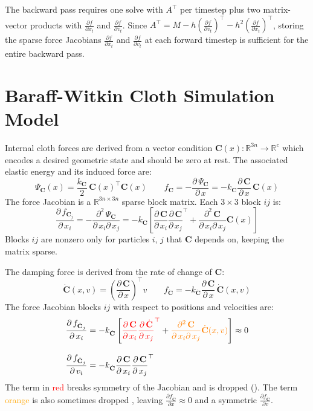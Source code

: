 \documentclass{article}
\newcommand{\pd}[2]{\dfrac{\partial\, #1}{\partial\, #2}}
\newcommand{\pdc}[2]{\frac{\partial #1}{\partial #2}}
\newcommand{\pdm}[3]{\dfrac{\partial^2\, #1}{\partial\, #2 \partial\, #3}}
\newcommand{\drop}[1]{\textcolor{red}{#1}}
\newcommand{\maybedrop}[1]{\textcolor{orange}{#1}}
\begin{document}
The backward pass requires one solve with $A^\top$ per timestep plus two matrix-vector products with $\pdc{f}{x_t}$ and $\pdc{f}{v_t}$. Since $A^\top = M - h\left(\pdc{f}{v_t}\right)^\top - h^2\left(\pdc{f}{x_t}\right)^\top$, storing the sparse force Jacobians $\pdc{f}{x_t}$ and $\pdc{f}{v_t}$ at each forward timestep is sufficient for the entire backward pass.

\newpage

\section{Baraff-Witkin Cloth Simulation Model \cite{baraff1998large}}
\label{sec:baraff_witkin}

Internal cloth forces are derived from a vector condition $\mathbf{C}(x) : \mathbb{R}^{3n}\rightarrow\mathbb{R}^c$ which encodes a desired geometric state and should be zero at rest. The associated elastic energy and its induced force are:
\begin{equation}
\label{eq:energy_force}
    \Psi_\mathbf{C}(x) = \frac{k_\mathbf{C}}{2}\, \mathbf{C}(x)^\top\mathbf{C}(x)
    \qquad
    f_\mathbf{C} = -\pd{\Psi_\mathbf{C}}{x} = 
    -k_\mathbf{C} \pd{\mathbf{C}}{x}\, \mathbf{C}(x)
\end{equation}
The force Jacobian is a $\mathbb{R}^{3n \times 3n}$ sparse block matrix. Each $3\times 3$ block $ij$ is:
\begin{equation}
\label{eq:force_jacobian}
\pd{f_{\mathbf{C}_j}}{x_i} = -\pdm{\Psi_\mathbf{C}}{x_i}{x_j} = 
    -k_\mathbf{C}\left[ 
        \pd{\mathbf{C}}{x_i} \pd{\mathbf{C}}{x_j}^\top + 
        \pdm{\mathbf{C}}{x_i}{x_j}\mathbf{C}(x)
    \right]
\end{equation}
Blocks $ij$ are nonzero only for particles $i$, $j$ that $\mathbf{C}$ depends on, keeping the matrix sparse.

The damping force is derived from the rate of change of $\mathbf{C}$:
\begin{equation}
\label{eq:damping_force}
    \dot{\mathbf{C}}(x, v) = \left(\pd{\mathbf{C}}{x}\right)^\top v
    \qquad
    f_{\dot{\mathbf{C}}} = -k_{\dot{\mathbf{C}}} \pd{\mathbf{C}}{x}\, \dot{\mathbf{C}}(x, v)
\end{equation}
The force Jacobian blocks $ij$ with respect to positions and velocities are:
\begin{align}
\label{eq:damping_jacobian_force}
    \pd{f_{\dot{\mathbf{C}}_j}}{x_i} &= -k_{\dot{\mathbf{C}}} \left[ 
        \drop{\pd{\mathbf{C}}{x_i} \pd{\dot{\mathbf{C}}}{x_j}^\top} + 
        \maybedrop{\pdm{\mathbf{C}}{x_i}{x_j} \dot{\mathbf{C}}(x, v)}
    \right] \approx 0\\[2ex]
    \pd{f_{\dot{\mathbf{C}}_j}}{v_i} &= -k_{\dot{\mathbf{C}}} 
        \pd{\mathbf{C}}{x_i} \pd{\mathbf{C}}{x_j}^\top
\end{align}
The term in \textcolor{red}{red} breaks symmetry of the Jacobian and is dropped (\cite{baraff1998large}). The term \textcolor{orange}{orange} is also sometimes dropped \cite{kim2020dynamic}, leaving $\frac{\partial f_{\dot{\mathbf{C}}}}{\partial x} \approx 0$ and a symmetric $\frac{\partial f_{\dot{\mathbf{C}}}}{\partial v}$.
\end{document}

